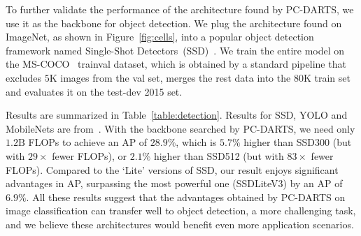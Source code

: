 \documentclass{article} \usepackage{iclr2020_conference,times}
\begin{document}
To further validate the performance of the architecture found by PC-DARTS, we use it as the backbone for object detection. We plug the architecture found on ImageNet, as shown in Figure~\ref{fig:cells}, into a popular object detection framework named Single-Shot Detectors~(SSD)~\citep{Liu2016SSDSS}. We train the entire model on the MS-COCO~\citep{Lin2014MicrosoftCC} trainval dataset, which is obtained by a standard pipeline that excludes $5\mathrm{K}$ images from the val set, merges the rest data into the $80\mathrm{K}$ train set and evaluates it on the test-dev 2015 set.

Results are summarized in Table~\ref{table:detection}. Results for SSD, YOLO and MobileNets are from~\citep{tan2018mnasnet}. With the backbone searched by PC-DARTS, we need only $1.2\mathrm{B}$ FLOPs to achieve an AP of $28.9\%$, which is $5.7\%$ higher than SSD300 (but with $29\times$ fewer FLOPs), or $2.1\%$ higher than SSD512 (but with $83\times$ fewer FLOPs). Compared to the `Lite' versions of SSD, our result enjoys significant advantages in AP, surpassing the most powerful one (SSDLiteV3) by an AP of $6.9\%$. All these results suggest that the advantages obtained by PC-DARTS on image classification can transfer well to object detection, a more challenging task, and we believe these architectures would benefit even more application scenarios.
\end{document}

